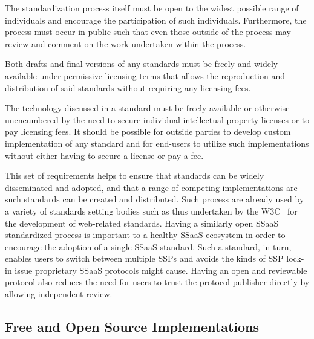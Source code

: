 \begin{packed_desc}
\item[Openness of Process:] The standardization process itself must be
  open to the widest possible range of individuals and encourage the
  participation of such individuals. Furthermore, the process must
  occur in public such that even those outside of the process may
  review and comment on the work undertaken within the process.
\item[Availability of Standards:] Both drafts and final versions of
  any standards must be freely and widely available under permissive
  licensing terms that allows the reproduction and distribution of
  said standards without requiring any licensing fees.
\item[Unencumbered by Intellectual Property Restrictions:] The
  technology discussed in a standard must be freely available or
  otherwise unencumbered by the need to secure individual intellectual
  property licenses or to pay licensing fees. It should be possible
  for outside parties to develop custom implementation of any standard
  and for end-users to utilize such implementations without either
  having to secure a license or pay a fee.
\end{packed_desc}

This set of requirements helps to ensure that standards can be widely
disseminated and adopted, and that a range of competing
implementations are such standards can be created and
distributed. Such process are already used by a variety of standards
setting bodies such as thus undertaken by the W3C~\cite{w3c} for the
development of web-related standards. Having a similarly open SSaaS
standardized process is important to a healthy SSaaS ecosystem in
order to encourage the adoption of a single SSaaS standard. Such a
standard, in turn, enables users to switch between multiple SSPs and
avoids the kinds of SSP lock-in issue proprietary SSaaS protocols
might cause. Having an open and reviewable protocol also reduces the
need for users to trust the protocol publisher directly by allowing
independent review.

\subsection{Free and Open Source Implementations}

